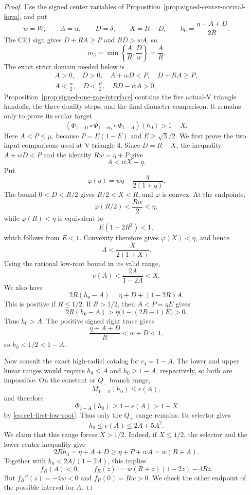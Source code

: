 \begin{proof}
Use the signed center variables of
Proposition~\ref{prop:signed-center-normal-form}, and put
\[
 w=W,\qquad A=\alpha,\qquad D=\delta,\qquad
 X=R-D,\qquad h_0=\frac{\eta+A+D}{2R}.
\]
The CE1 sign gives
$D+RA\ge P$ and $RD>wA$, so
\[
 m_3=\min\left\{\frac AR,\frac Dw\right\}=\frac AR.
\]
The exact strict domain needed below is
\begin{equation}
\begin{gathered}
 A>0,\quad D>0,\quad A+wD<P,\quad D+RA\ge P,\\
 A<\frac w2,\quad D<\frac R2,\quad RD-wA>0,
\end{gathered}
\label{eq:ce1-normal-domain}
\end{equation}
Proposition~\ref{prop:signed-one-gap-interface} contains the five actual-V triangle
handoffs, the three duality steps, and the final diameter comparison.
It remains only to prove its scalar target
\begin{equation}
 \left(\Phi_{1-D}\circ \Phi_{1-m_3}\circ \Phi_{1-A}\right)(h_0)>1-X.
 \label{eq:ce1-suffix}
\end{equation}
Here $A<P\le\mu$, because $P=E(1-E)$ and $E\ge\sqrt3/2$.  We first prove
the two input comparisons used at V triangle $4$.  Since $D=R-X$, the inequality
$A+wD<P$ and the identity $Rw=\eta+P$ give
\[
 A<wX-\eta.
\]
Put
\[
 \varphi(q)=wq-\frac{q}{2(1+q)}.
\]
The bound $0<D<R/2$ gives $R/2<X<R$, and $\varphi$ is convex.  At the
endpoints,
\[
 \varphi(R/2)<\frac{Rw}{2}<\eta,
\]
while $\varphi(R)<\eta$ is equivalent to
\[
 E(1-2R^2)<1,
\]
which follows from $E<1$.  Convexity therefore gives
$\varphi(X)<\eta$, and hence
\[
 A<\frac{X}{2(1+X)}.
\]
Using the rational low-root bound in its valid range,
\begin{equation}
 e(A)<\frac{2A}{1-2A}<X.
 \label{eq:ce1-first-low-root}
\end{equation}
We also have
\[
 2R(h_0-A)=\eta+D+(1-2R)A.
\]
This is positive if $R\le1/2$.  If $R>1/2$, then $A<P=\eta E$ gives
\[
 2R(h_0-A)>
 \eta\bigl(1-(2R-1)E\bigr)>0.
\]
Thus $h_0>A$. The positive signed right trace gives
\[
 \frac{\eta+A+D}{R}<w+D<1,
\]
so $h_0<1/2<1-A$.

Now consult the exact high-radial catalog for $c_4=1-A$.  The lower and
upper linear ranges would require $h_0\le A$ and $h_0\ge1-A$, respectively,
so both are impossible. On the constant or $Q_-$ branch range,
\[
 \overline M_{1-A}(h_0)\le e(A),
\]
and therefore
\[
 \Phi_{1-A}(h_0)\ge1-e(A)>1-X
\]
by \eqref{eq:ce1-first-low-root}.  Thus only the
$Q_+$ range remains.  Its selector gives
\[
 h_0\le e(A)\le2A+5A^2.
\]
We claim that this range forces $X>1/2$.  Indeed, if $X\le1/2$, the selector
and the lower center inequality give
\[
 2Rh_0=\eta+A+D\ge\eta+P+wA=w(R+A).
\]
Together with $h_0<2A/(1-2A)$, this implies
\[
 f_R(A)<0,
 \qquad
 f_R(z):=w(R+z)(1-2z)-4Rz.
\]
But $f_R''(z)=-4w<0$ and $f_R(0)=Rw>0$.  We check the other endpoint of
the possible interval for $A$.


\end{proof}
